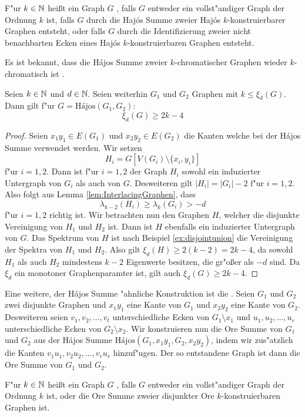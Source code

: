 F"ur $k\in {\mathbb{N}}$ hei{\ss}t ein Graph $G$ , falls $G$ entweder ein vollst"andiger Graph der Ordnung $k$ ist, falls $G$ durch die Haj\'os Summe zweier Haj\'os $k$-konstruierbarer Graphen entsteht, oder falls $G$ durch die Identifizierung zweier nicht benachbarten Ecken eines Haj\'os $k$-konstruierbaren Graphen entsteht. 

Es ist bekannt, dass die H\'ajos Summe zweier $k$-chromatischer Graphen wieder $k$-chromatisch ist . 

\begin{theorem}
  Seien $k\in{\mathbb{N}}$ und $d\in{\mathbb{N}}$. Seien weiterhin $G_1$ und $G_2$ Graphen mit $k\leq \xi_{d}(G)$. Dann gilt f"ur $G= \text{H\'ajos}(G_1,G_2)$:
  $$\xi_{d}(G) \geq 2k-4$$
  \label{thm:hajoseigenwerte}
\end{theorem}

\begin{proof}
  Seien $x_1y_1\in E(G_1)$ und $x_2y_2\in E(G_2)$ die Kanten welche bei der H\'ajos Summe verwendet werden. Wir setzen $$H_i = G[V(G_i)\setminus\{x_i,y_i\}] $$ f"ur $i=1,2$. Dann ist f"ur $i=1,2$ der Graph $H_i$ sowohl ein induzierter Untergraph von $G_i$ als auch von $G$. 
  Desweiteren gilt $|H_i| = |G_i|-2$ f"ur $i=1,2$. Also folgt aus Lemma \ref{lem:InterlacingGraphen}, dass $$\lambda_{k-2}(H_i) \geq \lambda_{k}(G_i) > -d$$ f"ur $i=1,2$ richtig ist. Wir betrachten nun den Graphen $H$, welcher die disjunkte Vereinigung von $H_1$ und $H_2$ ist. Dann ist $H$ ebenfalls ein induzierter Untergraph von $G$. 
  Das Spektrum von $H$ ist nach Beispiel \ref{ex:disjointunion} die Vereinigung der Spektra von $H_1$ und $H_2$. Also gilt $\xi_{d}(H) \geq 2(k-2) = 2k-4$, da sowohl $H_1$ als auch $H_2$ mindestens $k-2$ Eigenwerte besitzen, die gr"o{\ss}er als $-d$ sind. 
  Da $\xi_d$ ein monotoner Graphenparamter ist, gilt auch $\xi_{d}(G) \geq 2k-4$.
\end{proof}

Eine weitere, der H\'ajos Summe "ahnliche Konstruktion ist die  \cite{Ore67}. Seien $G_1$ und $G_2$ zwei disjunkte Graphen und $x_1y_1$ eine Kante von $G_1$ und $x_2y_2$ eine Kante von $G_2$. Desweiteren seien $v_1,v_2,\dots,v_t$ unterschiedliche Ecken von $G_1\setminus x_1$ und $u_1,u_2,\dots,u_r$ unterschiedliche Ecken von $G_2\setminus x_2$. Wir konstruieren nun die Ore Summe von $G_1$ und $G_2$ aus der H\'ajos Summe
$\text{H\'ajos}(G_1,x_1y_1, G_2, x_2y_2)$, indem wir zus"atzlich die Kanten $v_1u_1,v_2u_2,\dots,v_ru_r$ hinzuf"ugen. Der so entstandene Graph ist dann die Ore Summe von $G_1$ und $G_2$. 

F"ur $k\in{\mathbb{N}}$ hei{\ss}t ein Graph $G$ , falls $G$ entweder ein vollst"andiger Graph der Ordnung $k$ ist, oder die Ore Summe zweier disjunkter Ore $k$-konstruierbaren Graphen ist. 
